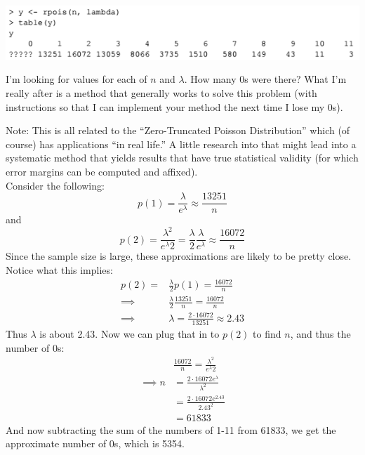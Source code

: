 \documentclass{scrartcl}
\begin{document}
\begin{enumerate}
\includegraphics[keepaspectratio=true, scale=0.75]{2.png}

I’m looking for values for each of $n$ and $\lambda$. How many 0s were there? What I’m really after is a method that generally works to solve this problem (with instructions so that I can implement your method the next time I lose my 0s).

Note: This is all related to the “Zero-Truncated Poisson Distribution” which (of course) has applications “in real life.” A little research into that might lead into a systematic method that yields results that have true statistical validity (for which error margins can be computed and affixed).\\

Consider the following: $$p(1) = \frac{\lambda}{e^\lambda} \approx \frac{13251}{n}$$ and $$p(2) = \frac{\lambda^2}{e^\lambda2} = \frac{\lambda}{2}\frac{\lambda}{e^\lambda} \approx \frac{16072}{n}$$ Since the sample size is large, these approximations are likely to be pretty close. Notice what this implies:
\begin{align*}
  p(2) = &\frac{\lambda}{2}p(1) = \frac{16072}{n}\\
  \implies &\frac{\lambda}{2}\frac{13251}{n} = \frac{16072}{n}\\
  \implies &\lambda = \frac{2\cdot16072}{13251} \approx 2.43
\end{align*}
Thus $\lambda$ is about 2.43. Now we can plug that in to $p(2)$ to find $n$, and thus the number of 0s:
\begin{align*}
  &\frac{16072}{n} = \frac{\lambda^2}{e^\lambda2}\\
  \implies n &= \frac{2\cdot16072e^{\lambda}}{\lambda^2}\\
  &   = \frac{2\cdot16072e^{2.43}}{2.43^2}\\
  &   = 61833
\end{align*}
And now subtracting the sum of the numbers of 1-11 from 61833, we get the approximate number of 0s, which is 5354.

\end{enumerate}
\end{document}
